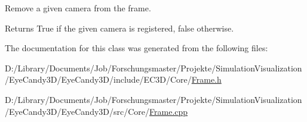 Remove a given camera from the frame. \begin{DoxyReturn}{Returns}
True if the given camera is registered, false otherwise. 
\end{DoxyReturn}


The documentation for this class was generated from the following files\+:\begin{DoxyCompactItemize}
\item 
D\+:/\+Library/\+Documents/\+Job/\+Forschungsmaster/\+Projekte/\+Simulation\+Visualization/\+Eye\+Candy3\+D/\+Eye\+Candy3\+D/include/\+E\+C3\+D/\+Core/\mbox{\hyperlink{_frame_8h}{Frame.\+h}}\item 
D\+:/\+Library/\+Documents/\+Job/\+Forschungsmaster/\+Projekte/\+Simulation\+Visualization/\+Eye\+Candy3\+D/\+Eye\+Candy3\+D/src/\+Core/\mbox{\hyperlink{_frame_8cpp}{Frame.\+cpp}}\end{DoxyCompactItemize}
